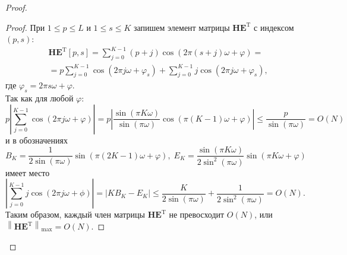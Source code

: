 \documentclass[specialist,
substylefile = spbu_report.rtx,
subf,href,colorlinks=true, 12pt]{disser}
\newcommand\norm[1]{\left\|#1\right\|}
\begin{document}
\begin{proof}
		\begin{proof}
			При $1\leqslant p \leqslant L$ и $1 \leqslant s \leqslant K$ запишем элемент матрицы $\mathbf{HE}^\mathrm{T}$ с индексом $(p, s)$:
			\begin{align*}
				&\mathbf{HE}^\mathrm{T}[p,s]=\sum_{j=0}^{K-1}(p+j)\cos(2\pi (s+j)\omega + \varphi)=\\
				&=p\sum_{j=0}^{K-1}\cos(2\pi j\omega + \varphi_s)+\sum_{j=0}^{K-1}j\cos(2\pi j\omega + \varphi_s),
			\end{align*}
			где $\varphi_s = 2\pi s\omega + \varphi$.
			\\
			Так как для любой $\varphi$:
			\begin{equation*}
				p\left|\sum_{j=0}^{K-1}\cos(2\pi j\omega + \varphi)\right| = p\left|\dfrac{\sin(\pi K\omega)}{\sin(\pi \omega)}\cos(\pi(K-1)\omega + \varphi)\right| \leqslant \dfrac{p}{\sin(\pi\omega)}=O(N)
			\end{equation*}
			и в обозначениях
			\begin{equation*}
				B_K = \dfrac{1}{2\sin(\pi\omega)}\sin(\pi(2K-1)\omega + \varphi),\; E_K = \dfrac{\sin(\pi K \omega)}{2\sin^2(\pi \omega)}\sin(\pi K\omega + \varphi)
			\end{equation*}
			имеет место
			\begin{equation*}
				\left|\sum_{j=0}^{K-1}j\cos(2\pi j\omega + \phi)\right|=\left|KB_K-E_K\right|\leqslant\dfrac{K}{2\sin(\pi\omega)} + \dfrac{1}{2\sin^2(\pi\omega)}=O(N).
			\end{equation*}
			Таким образом, каждый член матрицы $\mathbf{HE}^\mathrm{T}$ не превосходит $O(N)$, или $\norm{\mathbf{HE}^\mathrm{T}}_{\max}=O(N)$.
		\end{proof}
		

\end{proof}
\end{document}
